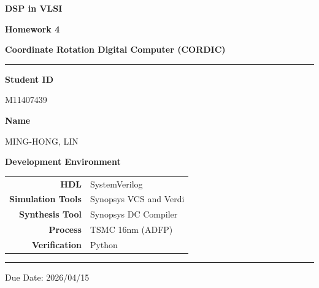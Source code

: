 \documentclass[12pt,a4paper]{report}
\begin{document}
\pagestyle{plain}

\begin{titlepage}
\centering
\vspace*{3cm}

{\fontsize{28}{34}\selectfont\bfseries DSP in VLSI\par}
\vspace{0.6em}
{\fontsize{20}{26}\selectfont\bfseries Homework 4\par}
\vspace{0.4em}
{\fontsize{16}{22}\selectfont\bfseries Coordinate Rotation Digital Computer (CORDIC)\par}

\vspace{1.5cm}
\textcolor{crimson}{\rule{0.6\linewidth}{1.2pt}}
\vspace{1.5cm}

{\large\bfseries Student ID}\par
\vspace{0.4em}
{\large M11407439}\par

\vspace{0.8em}

{\large\bfseries Name}\par
\vspace{0.4em}
{\large MING-HONG, LIN}\par

\vspace{2cm}

{\large\bfseries Development Environment}\par
\vspace{0.8em}
\begin{tabular}{rl}
    \textbf{HDL}              & SystemVerilog \\[4pt]
    \textbf{Simulation Tools} & Synopsys VCS and Verdi \\[4pt]
    \textbf{Synthesis Tool}   & Synopsys DC Compiler \\[4pt]
    \textbf{Process}          & TSMC 16nm (ADFP) \\[4pt]
    \textbf{Verification}     & Python \\
\end{tabular}

\vfill

\textcolor{crimson}{\rule{0.6\linewidth}{0.6pt}}\par
\vspace{0.5em}
{\small Due Date: 2026/04/15}

\end{titlepage}
\end{document}
